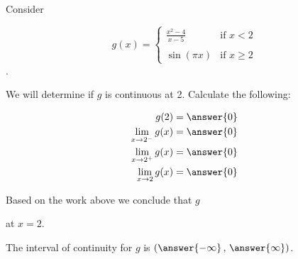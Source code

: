 \documentclass{ximera}
\author{Nela Lakos \and Kyle Parsons}
\begin{document}
\begin{exercise}

Consider

\[
g(x) = 
\begin{cases}
\frac{x^2-4}{x-5} & \text{if }x<2\\ \\
\sin(\pi x) & \text{if }x\geq2
\end{cases}
\].

We will determine if $g$ is continuous at 2.  Calculate the following:

\begin{align*}
g(2) &= \answer{0}\\
\lim_{x\to2^-}g(x) &= \answer{0}\\
\lim_{x\to2^+}g(x) &= \answer{0}\\
\lim_{x\to2}g(x) &= \answer{0}
\end{align*}

\begin{exercise}

Based on the work above we conclude that $g$
\begin{multipleChoice}
\end{multipleChoice}
at $x=2$.

\begin{exercise}

The interval of continuity for $g$ is $\left(\answer{-\infty}\, , \,\answer{\infty}\right)$.

\end{exercise}
\end{exercise}
\end{exercise}
\end{document}

